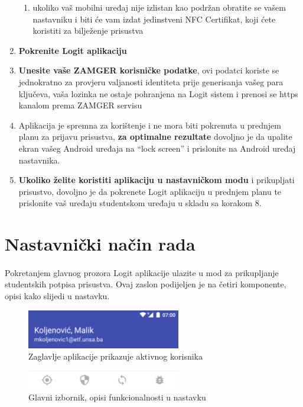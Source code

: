 \begin{enumerate}
    \begin{enumerate}
        \item ukoliko vaš mobilni uređaj nije izlistan kao podržan obratite se vašem nastavniku i biti će vam izdat jedinstveni NFC Certifikat, koji ćete koristiti za bilježenje prisustva
    \end{enumerate}
    \item \textbf{Pokrenite Logit aplikaciju}
    \item \textbf{Unesite vaše ZAMGER korisničke podatke}, ovi podatci koriste se jednokratno za provjeru valjanosti identiteta prije generisanja vašeg para ključeva, vaša lozinka ne ostaje pohranjena na Logit sistem i prenosi se https kanalom prema ZAMGER servisu
    \item Aplikacija je spremna za korištenje i ne mora biti pokrenuta u prednjem planu za prijavu prisustva, \textbf{za optimalne rezultate} dovoljno je da upalite ekran vašeg Android uređaja na “lock screen” i prislonite na Android uređaj nastavnika.
    \item \textbf{Ukoliko želite koristiti aplikaciju u nastavničkom modu} i prikupljati prisustvo, dovoljno je da pokrenete Logit aplikaciju u prednjem planu te prislonite vaš uređaju studentskom uređaju u skladu sa korakom 8.
\end{enumerate}

\section{Nastavnički način rada}
\paragraph*{}
Pokretanjem glavnog prozora Logit aplikacije ulazite u mod za prikupljanje studentskih potpisa prisustva. Ovaj zaslon podijeljen je na četiri komponente, opisi kako slijedi u nastavku.

\begin{figure}[H]
    \centering
    \includegraphics[width=0.6\textwidth]{material/manual/01-head}
    \caption{Zaglavlje aplikacije prikazuje aktivnog korisnika}
\end{figure}

\begin{figure}[H]
    \centering
    \includegraphics[width=0.6\textwidth]{material/manual/02-menu}
    \caption{Glavni izbornik, opisi funkcionalnosti u nastavku}
\end{figure}


